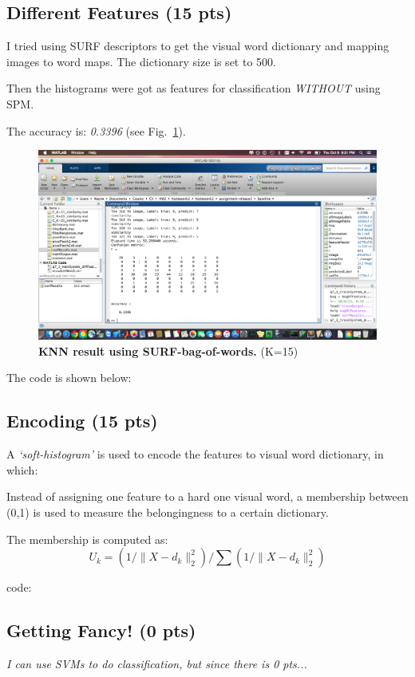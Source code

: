 \documentclass[12pt]{article}
\newcounter{list}
\begin{document}
\subsection{Different Features (15 pts)}
I tried using SURF descriptors to get the visual word dictionary and mapping images to word maps. The dictionary size is set to 500.

Then the histograms were got as features for classification \emph{WITHOUT} using SPM.

The accuracy is: \emph{0.3396} (see Fig.~\ref{fig:knn_surf}).

\begin{figure}[ht!]
  \centering \includegraphics[width=0.8\linewidth]{./figures/K=15_surf}
  \caption{{\bf KNN result using SURF-bag-of-words.} (K=15)}
  \label{fig:knn_surf}
\end{figure}  

The code is shown below:


\subsection{Encoding (15 pts)}
A \emph{`soft-histogram'} is used to encode the features to visual word dictionary\cite{ahonen2007soft}, in which:

Instead of assigning one feature to a hard one visual word, a membership between (0,1) is used to measure the belongingness to a certain dictionary. 

The membership is computed as:
\[ U_k = (1/\|X-d_k\|^2_2)/\sum(1/\|X-d_k\|^2_2) \]

code:


\subsection{Getting Fancy! (0 pts)}
\emph{I can use SVMs to do classification, but since there is 0 pts...}

 

\end{document}
